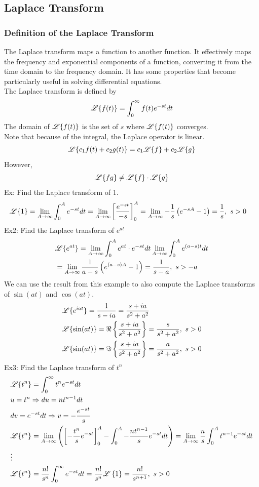 \documentclass[11pt, fleqn]{article}
\begin{document}
\subsection{Laplace Transform}
\subsubsection{Definition of the Laplace Transform}
The Laplace transform maps a function to another function. It effectively maps the frequency and exponential components of a function, converting it from the time domain to the frequency domain. It has some properties that become particularly useful in solving differential equations.\\
The Laplace transform is defined by
$$\mathscr{L}\{f(t)\}=\int_0^\infty f(t)e^{-st}dt$$
The domain of $\mathscr{L}\{f(t)\}$ is the set of $s$ where $\mathscr{L}\{f(t)\}$ converges.\\
Note that because of the integral, the Laplace operator is linear.
$$\mathscr{L}\{c_1f(t)+c_2g(t)\}=c_1\mathscr{L}\{f\}+c_2\mathscr{L}\{g\}$$
However,
$$\mathscr{L}\{fg\}\neq\mathscr{L}\{f\}\cdot\mathscr{L}\{g\}$$
Ex: Find the Laplace transform of $1$.
\begin{align*}
    &\lap\{1\}=\lim_{A\to\infty}\int_0^Ae^{-st}dt=\lim_{A\to\infty}\brsquare{\frac{e^{-st}}{-s}}_0^A=\lim_{A\to\infty}-\frac{1}{s}\brround{e^{-sA}-1}=\frac{1}{s},\ s>0
\end{align*}
Ex2: Find the Laplace transform of $e^{at}$
\begin{align*}
    &\lap\{e^{at}\}=\lim_{A\to\infty}\int_0^Ae^{at}\cdot e^{-st}dt\lim_{A\to\infty}\int_0^Ae^{(a-s)t}dt\\
    &=\lim_{A\to\infty}\frac{1}{a-s}\brround{e^{(a-s)A}-1}=\frac{1}{s-a},\ s>-a
\end{align*}
We can use the result from this example to also compute the Laplace transforms of $\sin(at)$ and $\cos(at)$.
\begin{align*}
    &\lap\{e^{iat}\}=\frac{1}{s-ia}=\frac{s+ia}{s^2+a^2}\\
    &\lap\{\sin(at)\}=\Re\brcurly{\frac{s+ia}{s^2+a^2}}=\frac{s}{s^2+a^2},\ s>0\\
    &\lap\{\sin(at)\}=\Im\brcurly{\frac{s+ia}{s^2+a^2}}=\frac{a}{s^2+a^2},\ s>0
\end{align*}
Ex3: Find the Laplace transform of $t^n$
\begin{align*}
    &\mathscr{L}\{t^n\}=\int_0^\infty t^ne^{-st}dt\\
    &u=t^n\Rightarrow du=nt^{n-1}dt\\
    &dv=e^{-st}dt\Rightarrow v=-\frac{e^{-st}}{s}\\
    &\mathscr{L}\{t^n\}=\lim_{A\to\infty}\left( \left[ -\frac{t^n}{s}e^{-st} \right]_0^A-\int_0^A-\frac{nt^{n-1}}{s}e^{-st}dt \right)=\lim_{A\to\infty}\frac{n}{s}\int_0^At^{n-1}e^{-st}dt\\
    &\vdots\\
    &\mathscr{L}\{t^n\}=\frac{n!}{s^n}\int_0^\infty e^{-st}dt=\frac{n!}{s^n}\mathscr{L}\left\{ 1 \right\}=\frac{n!}{s^{n+1}},\ s>0
\end{align*}
\end{document}
